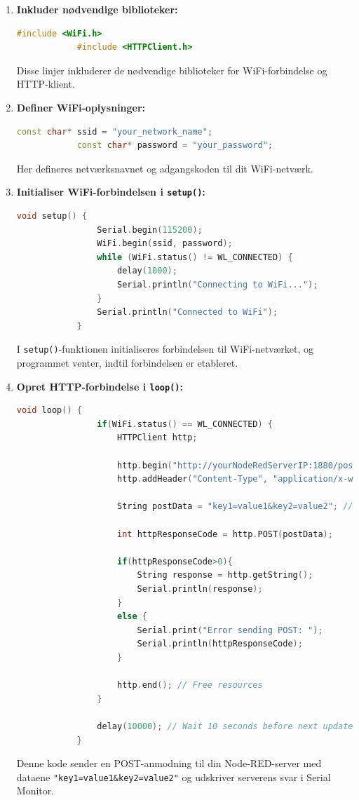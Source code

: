 \documentclass[12pt,a4paper]{book}
\begin{document}
	\begin{enumerate}
		\item \textbf{Inkluder nødvendige biblioteker:}
		\begin{lstlisting}[language=C++, caption=Include necessary libraries]
			#include <WiFi.h>
			#include <HTTPClient.h>
		\end{lstlisting}
		Disse linjer inkluderer de nødvendige biblioteker for WiFi-forbindelse og HTTP-klient.
		
		\item \textbf{Definer WiFi-oplysninger:}
		\begin{lstlisting}[language=C++, caption=Define WiFi credentials]
			const char* ssid = "your_network_name";
			const char* password = "your_password";
		\end{lstlisting}
		Her defineres netværksnavnet og adgangskoden til dit WiFi-netværk.
		
		\item \textbf{Initialiser WiFi-forbindelsen i \texttt{setup()}:}
		\begin{lstlisting}[language=C++, caption=Initialize WiFi connection in setup()]
			void setup() {
				Serial.begin(115200);
				WiFi.begin(ssid, password);
				while (WiFi.status() != WL_CONNECTED) {
					delay(1000);
					Serial.println("Connecting to WiFi...");
				}
				Serial.println("Connected to WiFi");
			}
		\end{lstlisting}
		I \texttt{setup()}-funktionen initialiseres forbindelsen til WiFi-netværket, og programmet venter, indtil forbindelsen er etableret.
		
		\item \textbf{Opret HTTP-forbindelse i \texttt{loop()}:}
		\begin{lstlisting}[language=C++, caption=Create HTTP connection in loop()]
			void loop() {
				if(WiFi.status() == WL_CONNECTED) {
					HTTPClient http;
					
					http.begin("http://yourNodeRedServerIP:1880/postdata"); // Specify the URL
					http.addHeader("Content-Type", "application/x-www-form-urlencoded"); // Set content type
					
					String postData = "key1=value1&key2=value2"; // Your POST data
					
					int httpResponseCode = http.POST(postData);
					
					if(httpResponseCode>0){
						String response = http.getString();
						Serial.println(response);
					}
					else {
						Serial.print("Error sending POST: ");
						Serial.println(httpResponseCode);
					}
					
					http.end(); // Free resources
				}
				
				delay(10000); // Wait 10 seconds before next update
			}
		\end{lstlisting}
		Denne kode sender en POST-anmodning til din Node-RED-server med dataene \texttt{"key1=value1\&key2=value2"} og udskriver serverens svar i Serial Monitor.
	\end{enumerate}
	
\end{document}
